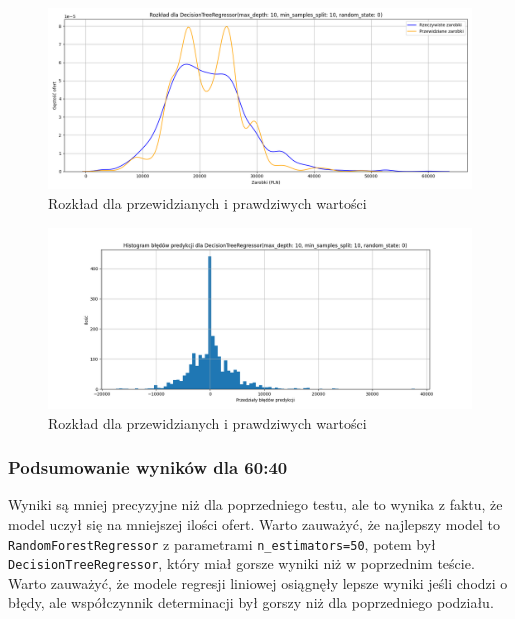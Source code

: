\documentclass[a4paper]{article}
\begin{document}
\begin{figure}[H]
    \centering
    \includegraphics[width=\textwidth]{../analysis/plots/wyniki/0.6&0.4/DecisionTreeRegressor/salary_dist.png}
    \caption{Rozkład dla przewidzianych i prawdziwych wartości}
\end{figure}

\begin{figure}[H]
    \centering
    \includegraphics[width=\textwidth]{../analysis/plots/wyniki/0.6&0.4/DecisionTreeRegressor/errors.png}
    \caption{Rozkład dla przewidzianych i prawdziwych wartości}
\end{figure}

\subsubsection{Podsumowanie wyników dla 60:40}


\quad Wyniki są mniej precyzyjne niż dla poprzedniego testu, ale to wynika z faktu, że model uczył się na mniejszej
ilości ofert. Warto zauważyć, że najlepszy model to \texttt{RandomForestRegressor} z parametrami \texttt{n\_estimators=50},
potem był \texttt{DecisionTreeRegressor}, który miał gorsze wyniki niż w poprzednim teście. Warto zauważyć, że modele regresji liniowej osiągnęły lepsze wyniki jeśli chodzi o błędy, ale współczynnik determinacji był gorszy niż dla poprzedniego podziału.
\end{document}
